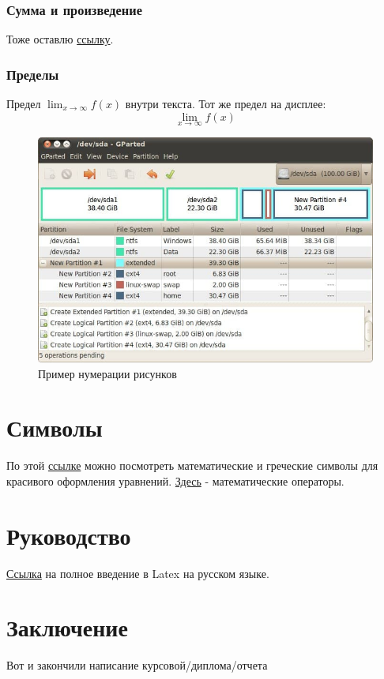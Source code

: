     \subsubsection{Сумма и произведение}
    Тоже оставлю \href{https://www.overleaf.com/learn/latex/Integrals,_sums_and_limits#Sums_and_products}{ссылку}.
    
    \subsubsection{Пределы}
    
    Предел \(\lim_{x\to\infty} f(x)\) внутри текста.
    Тот же предел на дисплее:
    \[
    \lim_{x\to\infty} f(x)
    \]
\begin{figure}[!htb]
	\centering
	\includegraphics[width=\textwidth]{Images/image2.jpg}
	\caption{Пример нумерации рисунков}
	\label{fig:image2}
\end{figure}

\section{Символы}
По этой   \href{https://www.overleaf.com/learn/latex/List_of_Greek_letters_and_math_symbols}{ссылке} можно посмотреть математические и греческие символы для красивого оформления уравнений. \href{https://www.overleaf.com/learn/latex/Operators}{Здесь} - математические операторы.


\section{Руководство}
\href{https://www.texlive.info/CTAN/info/lshort/russian/lshortru.pdf}{Ссылка} на полное введение в Latex на русском языке.


\section{Заключение}
Вот и закончили написание курсовой/диплома/отчета


